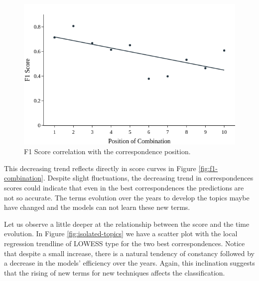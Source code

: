 \begin{figure}[h!]
	\centering
	\includegraphics[width=0.6\linewidth]{01.Chapters/05.Results/combination-corr}
	\caption{F1 Score correlation with the correspondence position.}
	\label{fig:combination-corr}
\end{figure}

This decreasing trend reflects directly in score curves in Figure \ref{fig:f1-combination}. Despite slight fluctuations, the decreasing trend in correspondences scores could indicate that even in the best correspondences the predictions are not so accurate. The terms evolution over the years to develop the topics maybe have changed and the models can not learn these new terms.

Let us observe a little deeper at the relationship between the score and the time evolution. In Figure \ref{fig:isolated-topics} we have a scatter plot with the local regression trendline of LOWESS type for the two best correspondences. Notice that despite a small increase, there is a natural tendency of constancy followed by a decrease in the models' efficiency over the years. Again, this inclination suggests that the rising of new terms for new techniques affects the classification.

